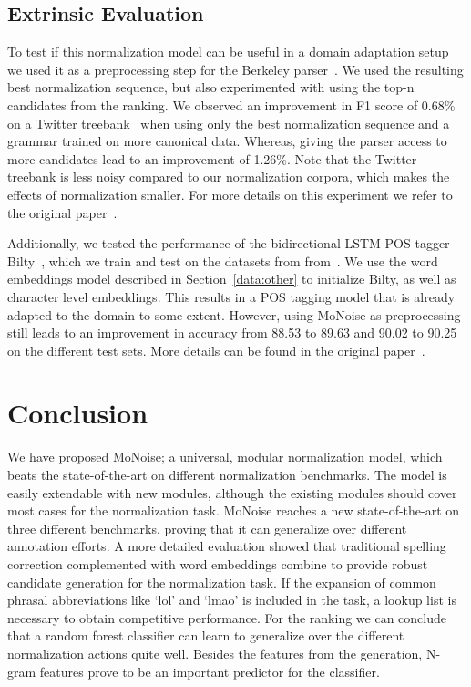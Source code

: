 \documentclass[a4paper,10pt,twoside]{article}
\begin{document}
\subsection{Extrinsic Evaluation}
To test if this normalization model can be useful in a domain adaptation setup
we used it as a preprocessing step for the Berkeley
parser~\cite{petrov-klein:2007:main}.  We used the resulting best normalization
sequence, but also experimented with using the top-n candidates from the
ranking. We observed an improvement in F1 score of 0.68\% on a Twitter
treebank~\cite{foster2011hardtoparse} when using only the best normalization
sequence and a grammar trained on more canonical data. Whereas, giving the
parser access to more candidates lead to an improvement of 1.26\%.  Note that
the Twitter treebank is less noisy compared to our normalization corpora, which
makes the effects of normalization smaller. For more details on this experiment
we refer to the original paper~\cite{vandergoot:2017:ACL2017}.

Additionally, we tested the performance of the bidirectional LSTM POS tagger
Bilty~\cite{plank-sogaard-goldberg:2016:P16-2}, which we train and test on the
datasets from from~. We use the word embeddings model
described in Section~\ref{data:other} to initialize Bilty, as well as character
level embeddings.  This results in a POS tagging model that is already adapted
to the domain to some extent. However, using MoNoise as preprocessing still
leads to an improvement in accuracy from 88.53 to 89.63 and 90.02 to 90.25 on
the different test sets.  More details can be found in the original
paper~\cite{goot:2017:wnut}.

 
\section{Conclusion}
\label{sec:conclusion}
We have proposed MoNoise; a universal, modular normalization model, which beats
the state-of-the-art on different normalization benchmarks. The model is easily
extendable with new modules, although the existing modules should cover most
cases for the normalization task. MoNoise reaches a new state-of-the-art on
three different benchmarks, proving that it can generalize over different
annotation efforts. A more detailed evaluation showed that traditional spelling
correction complemented with word embeddings combine to provide robust
candidate generation for the normalization task.  If the expansion of common
phrasal abbreviations like `lol' and `lmao' is included in the task, a lookup
list is necessary to obtain competitive performance. For the ranking we can
conclude that a random forest classifier can learn to generalize over the
different normalization actions quite well. Besides the features from the
generation, N-gram features prove to be an important predictor for the
classifier.
\end{document}
